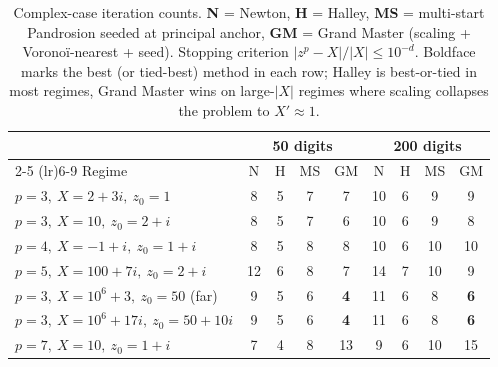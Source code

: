 \documentclass[11pt,a4paper]{article}
\theoremstyle{definition}
\begin{document}
\begin{table}[H]
\centering
\footnotesize
\renewcommand{\arraystretch}{1.15}
\begin{tabular}{@{}lcccccccc@{}}
\toprule
& \multicolumn{4}{c}{\textbf{50 digits}} & \multicolumn{4}{c}{\textbf{200 digits}} \\
\cmidrule(lr){2-5} \cmidrule(lr){6-9}
Regime & N & H & MS & GM & N & H & MS & GM \\
\midrule
$p=3,\ X=2+3i,\ z_0 = 1$                   & 8  & 5 & 7 & 7  & 10 & 6 & 9  & 9  \\
$p=3,\ X=10,\ z_0 = 2+i$                   & 8  & 5 & 7 & 6  & 10 & 6 & 9  & 8  \\
$p=4,\ X=-1+i,\ z_0 = 1+i$                 & 8  & 5 & 8 & 8  & 10 & 6 & 10 & 10 \\
$p=5,\ X=100+7i,\ z_0 = 2+i$               & 12 & 6 & 8 & 7  & 14 & 7 & 10 & 9  \\
$p=3,\ X=10^6+3,\ z_0 = 50$ (far)          & 9  & 5 & 6 & \textbf{4} & 11 & 6 & 8 & \textbf{6} \\
$p=3,\ X=10^6+17i,\ z_0 = 50+10i$          & 9  & 5 & 6 & \textbf{4} & 11 & 6 & 8 & \textbf{6} \\
$p=7,\ X=10,\ z_0 = 1+i$                   & 7  & 4 & 8 & 13 & 9  & 6 & 10 & 15 \\
\bottomrule
\end{tabular}
\caption{Complex-case iteration counts. \textbf{N} = Newton, \textbf{H} = Halley, \textbf{MS} = multi-start Pandrosion seeded at principal anchor, \textbf{GM} = Grand Master (scaling + Voronoï-nearest + seed). Stopping criterion $|z^p - X|/|X| \leq 10^{-d}$. Boldface marks the best (or tied-best) method in each row; Halley is best-or-tied in most regimes, Grand Master wins on large-$|X|$ regimes where scaling collapses the problem to $X' \approx 1$.}
\label{tab:benchmark-complex}
\end{table}
\end{document}
